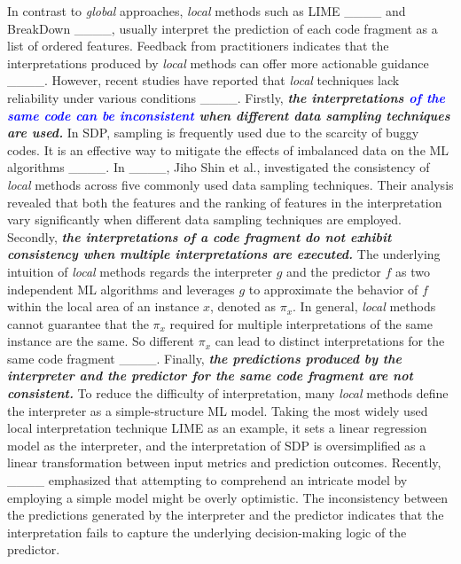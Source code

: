 In contrast to \textit{global} approaches, \textit{local} methods such as LIME ____ and BreakDown ____, usually interpret the prediction of each code fragment as a list of ordered features. Feedback from practitioners indicates that the interpretations produced by \textit{local} methods can offer more actionable guidance ____.
However, recent studies have reported that \textit{local} techniques lack reliability under various conditions ____. Firstly, \textit{\textbf{ the interpretations \textcolor{blue}{of the same code can be inconsistent} when different data sampling techniques are used.}} 
In SDP, sampling is frequently used due to the scarcity of buggy codes. It is an effective way to mitigate the effects of imbalanced data on the ML algorithms ____. In ____, Jiho Shin et al., investigated the consistency of \textit{local} methods across five commonly used data sampling techniques. Their analysis revealed that both the features and the ranking of features in the interpretation vary significantly when different data sampling techniques are employed.
Secondly, \textit{\textbf{the interpretations of a code fragment do not exhibit consistency when multiple interpretations are executed.}} The underlying intuition of \textit{local} methods regards the interpreter $g$ and the predictor $f$ as two independent ML algorithms and leverages $g$ to approximate the behavior of $f$ within the local area of an instance $x$, denoted as $\pi_x$. In general, \textit{local} methods cannot guarantee that the $\pi_x$ required for multiple interpretations of the same instance are the same. So different $\pi_x$ can lead to distinct interpretations for the same code fragment ____. Finally, \textit{\textbf{the predictions produced by the interpreter and the predictor for the same code fragment are not consistent.}} To reduce the difficulty of interpretation, many \textit{local} methods define the interpreter as a simple-structure ML model. Taking the most widely used local interpretation technique LIME as an example, it sets a linear regression model as the interpreter, and the interpretation of SDP is oversimplified as a linear transformation between input metrics and prediction outcomes.
Recently, ____ emphasized that attempting to comprehend an intricate model by employing a simple model might be overly optimistic. The inconsistency between the predictions generated by the interpreter and the predictor indicates that the interpretation fails to capture the underlying decision-making logic of the predictor.

